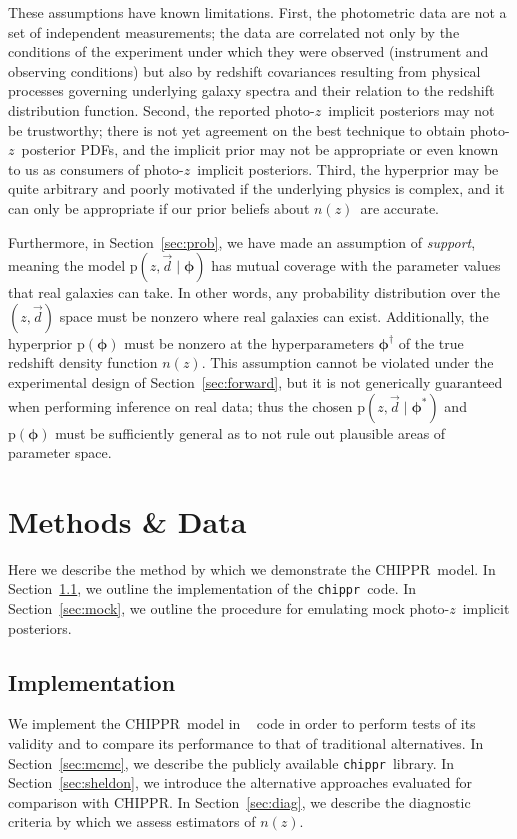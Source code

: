 \documentclass[iop]{emulateapj}
\newcommand{\new}[2]{{\color{red}\sout{#1}}\ {\color{blue}{#2}}}%
\newcommand{\Sect}[1]{Section~\ref{#1}}
\newcommand{\Fig}[1]{Figure~\ref{#1}}
\newcommand{\project}[1]{\textsc{#1}}
\newcommand{\Chippr}{\project{CHIPPR}}
\newcommand{\repo}[1]{\texttt{#1}}
\newcommand{\chippr}{\repo{chippr}}
\newcommand{\data}{\ensuremath{\vec{d}}}
\newcommand{\pr}[1]{\ensuremath{\mathrm{p}(#1)}}
\newcommand{\gvn}{\mid}
\newcommand{\pz}{photo-$z$}
\newcommand{\pzpdf}{\pz\ posterior PDF}
\newcommand{\pzip}{\pz\ implicit posterior}
\newcommand{\nz}{$n(z)$}
\newcommand{\bvec}[1]{\ensuremath{\boldsymbol{#1}}}
\newcommand{\ndphi}{\bvec{\phi}}
\begin{document}
These assumptions have known limitations.  
First, the photometric data are not a set of independent measurements; 
the data are correlated not only by the conditions of the experiment under which they were observed (instrument and observing conditions) but also by redshift covariances resulting from physical processes governing underlying galaxy spectra and their relation to the redshift distribution function.
Second, the reported \pzip s may not be trustworthy; 
there is not yet agreement on the best technique to obtain \pzpdf s, and the implicit prior may not be appropriate or even known to us as consumers of \pzip s.  
Third, the hyperprior may be quite arbitrary and poorly motivated if the underlying physics is complex, and it can only be appropriate if our prior beliefs about \nz\ are accurate.

Furthermore, in Section~\ref{sec:prob}, we have made an assumption of \textit{support}, meaning the model $\pr{z, \data \gvn \ndphi}$ has mutual coverage with the parameter values that real galaxies can take.  
In other words, any probability distribution over the $(z, \data)$ space must be nonzero where real galaxies can exist. 
Additionally, the hyperprior $\pr{\ndphi}$ must be nonzero at the hyperparameters $\ndphi^{\dagger}$ of the true redshift density function \nz.
This assumption cannot be violated under the experimental design of Section~\ref{sec:forward}, but it is not generically guaranteed when performing inference on real data;
thus the chosen $\pr{z, \data \gvn \ndphi^{*}}$ and $\pr{\ndphi}$ must be sufficiently general as to not rule out plausible areas of parameter space.

\section{Methods \& Data}
\label{sec:application}

Here we describe the method by which we demonstrate the \Chippr\ model.
In \Sect{sec:exp}, we outline the implementation of the \chippr\ code.
In \Sect{sec:mock}, we outline the procedure for emulating mock \pzip s.

\subsection{Implementation}
\label{sec:exp}

We implement the \Chippr\ model in \new{}{a prototype} code in order to perform tests of its validity and to compare its performance to that of traditional alternatives.
In \Sect{sec:mcmc}, we describe the publicly available \chippr\ library.
In \Sect{sec:sheldon}, we introduce the alternative approaches evaluated for comparison with \Chippr.
In \Sect{sec:diag}, we describe the diagnostic criteria by which we assess estimators of \nz.
\end{document}
